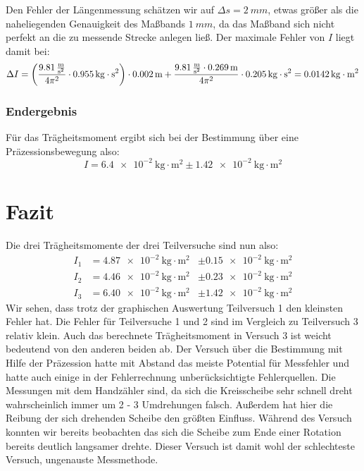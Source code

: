 \documentclass{article}
\begin{document}
	Den Fehler der Längenmessung schätzen wir auf \( \Delta s = \SI{2}{mm} \), etwas größer als die naheliegenden Genauigkeit des Maßbands \(\SI{1}{mm}\),
	da das Maßband sich nicht perfekt an die zu messende Strecke anlegen ließ. Der maximale Fehler von \( I \) liegt damit bei: %
	\begin{equation}
		\Delta I = \left( \frac{ \SI{9,81}{ \frac{\metre}{\second^2} } }{ 4 \pi^2 } \cdot \SI{0,955}{\kilogram \cdot \second^2} \right) \cdot \SI{0,002}{\metre} +
		\frac{ \SI{9,81}{ \frac{\metre}{\second^2} } \cdot \SI{0,269}{\metre} }{ 4 \pi^2 } \cdot \SI{0,205}{\kilogram \cdot \second^2} = \SI{0,0142}{\kilogram \cdot \metre^2}
	\end{equation}

	\subsubsection{Endergebnis}
	Für das Trägheitsmoment ergibt sich bei der Bestimmung über eine Präzessionsbewegung also:
	\begin{equation}
		I = \SI{6,4e-2}{\kilogram \cdot \metre^2} \pm \SI{1,42e-2}{\kilogram \cdot \metre^2}
	\end{equation}

	\section{Fazit}
	Die drei Trägheitsmomente der drei Teilversuche sind nun also:
	\begin{equation*}
		\begin{aligned}
			I_1 & = \SI{4,87e-2}{ \kilogram \cdot \metre^2 } & \pm \SI{0,15e-2}{ \kilogram \cdot \metre^2 } \\
			I_2 & = \SI{4,46e-2}{ \kilogram \cdot \metre^2 } & \pm \SI{0,23e-2}{ \kilogram \cdot \metre^2 } \\
			I_3 & = \SI{6,40e-2}{ \kilogram \cdot \metre^2 } & \pm \SI{1,42e-2}{\kilogram \cdot \metre^2}
		\end{aligned}
	\end{equation*}
	Wir sehen, dass trotz der graphischen Auswertung Teilversuch 1 den kleinsten Fehler hat. Die Fehler für Teilversuche 1 und 2 sind im Vergleich zu Teilversuch 3
	relativ klein. Auch das berechnete Trägheitsmoment in Versuch 3 ist weicht bedeutend von den anderen beiden ab.
	Der Versuch über die Bestimmung mit Hilfe der Präzession hatte mit Abstand das meiste Potential für Messfehler und hatte auch einige in der Fehlerrechnung unberücksichtigte Fehlerquellen.
	Die Messungen mit dem Handzähler sind, da sich die Kreisscheibe sehr schnell dreht wahrscheinlich immer um 2 - 3 Umdrehungen falsch. Außerdem hat hier die Reibung der sich drehenden Scheibe den
	größten Einfluss. Während des Versuch konnten wir bereits beobachten das sich die Scheibe zum Ende einer Rotation bereits deutlich langsamer drehte.
	Dieser Versuch ist damit wohl der schlechteste Versuch, ungenauste Messmethode.
\end{document}
